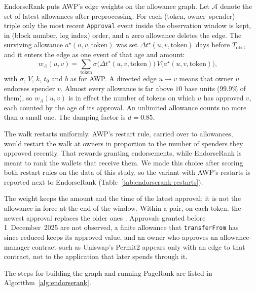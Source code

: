 
EndorseRank puts AWP's edge weights on the allowance graph. Let $\mathcal{A}$ denote the set of latest allowances after preprocessing. For each (token, owner--spender) triple only the most recent \texttt{Approval} event inside the observation window is kept, in (block number, log index) order, and a zero allowance deletes the edge. The surviving allowance $a^{\star}(u,v,\mathrm{token})$ was set $\Delta t^{\star}(u,v,\mathrm{token})$ days before $T_{\mathrm{obs}}$, and it enters the edge as one event of that age and amount:
\begin{equation}
\label{eq:approve-weight}
w_A(u,v)
=
\sum_{\mathrm{token}}
\sigma\bigl(\Delta t^{\star}(u,v,\mathrm{token})\bigr)\,
V\bigl(a^{\star}(u,v,\mathrm{token})\bigr),
\end{equation}
with $\sigma$, $V$, $k$, $t_0$ and $b$ as for AWP. A directed edge $u\to v$ means that owner $u$ endorses spender $v$. Almost every allowance is far above $10$ base units ($99.9\%$ of them), so $w_A(u,v)$ is in effect the number of tokens on which $u$ has approved $v$, each counted by the age of its approval. An unlimited allowance counts no more than a small one. The damping factor is $d=0.85$.

The walk restarts uniformly. AWP's restart rule, carried over to allowances, would restart the walk at owners in proportion to the number of spenders they approved recently. That rewards granting endorsements, while EndorseRank is meant to rank the wallets that receive them. We made this choice after scoring both restart rules on the data of this study, so the variant with AWP's restarts is reported next to EndorseRank (Table~\ref{tab:endorserank-restarts}).

The weight keeps the amount and the time of the latest approval; it is not the allowance in force at the end of the window. Within a pair, on each token, the newest approval replaces the older ones . Approvals granted before 1~December~2025 are not observed, a finite allowance that \texttt{transferFrom} has since reduced keeps its approved value, and an owner who approves an allowance-manager contract such as Uniswap's Permit2 appears only with an edge to that contract, not to the application that later spends through it.

The steps for building the graph and running PageRank are listed in Algorithm~\ref{alg:endorserank}.

